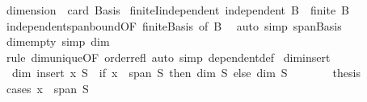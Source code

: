 \begin{isabellebody}
\isanewline
\isanewline
{}\isamarkupfalse%
\ {\isachardoublequoteopen}dimension\ {\isacharequal}{\kern0pt}\ card\ Basis{\isachardoublequoteclose}\isanewline
\isanewline
{}\isamarkupfalse%
\ finiteI{\isacharunderscore}{\kern0pt}independent{\isacharcolon}{\kern0pt}\ {\isachardoublequoteopen}independent\ B\ {\isasymLongrightarrow}\ finite\ B{\isachardoublequoteclose}\isanewline
%
\isadelimproof
\ \ %
\endisadelimproof
%
\isatagproof
{}\isamarkupfalse%
\ independent{\isacharunderscore}{\kern0pt}span{\isacharunderscore}{\kern0pt}bound{\isacharbrackleft}{\kern0pt}OF\ finite{\isacharunderscore}{\kern0pt}Basis{\isacharcomma}{\kern0pt}\ of\ B{\isacharbrackright}{\kern0pt}\ \isamarkupfalse%
\ {\isacharparenleft}{\kern0pt}auto\ simp{\isacharcolon}{\kern0pt}\ span{\isacharunderscore}{\kern0pt}Basis{\isacharparenright}{\kern0pt}%
\endisatagproof
{\isafoldproof}%
%
\isadelimproof
\isanewline
%
\endisadelimproof
\isanewline
{}\isamarkupfalse%
\ dim{\isacharunderscore}{\kern0pt}empty\ {\isacharbrackleft}{\kern0pt}simp{\isacharbrackright}{\kern0pt}{\isacharcolon}{\kern0pt}\ {\isachardoublequoteopen}dim\ {\isacharbraceleft}{\kern0pt}{\isacharbraceright}{\kern0pt}\ {\isacharequal}{\kern0pt}\ {}{\isachardoublequoteclose}\isanewline
%
\isadelimproof
\ \ %
\endisadelimproof
%
\isatagproof
{}\isamarkupfalse%
\ {\isacharparenleft}{\kern0pt}rule\ dim{\isacharunderscore}{\kern0pt}unique{\isacharbrackleft}{\kern0pt}OF\ order{\isacharunderscore}{\kern0pt}refl{\isacharbrackright}{\kern0pt}{\isacharparenright}{\kern0pt}\ {\isacharparenleft}{\kern0pt}auto\ simp{\isacharcolon}{\kern0pt}\ dependent{\isacharunderscore}{\kern0pt}def{\isacharparenright}{\kern0pt}%
\endisatagproof
{\isafoldproof}%
%
\isadelimproof
\isanewline
%
\endisadelimproof
\isanewline
{}\isamarkupfalse%
\ dim{\isacharunderscore}{\kern0pt}insert{\isacharcolon}{\kern0pt}\isanewline
\ \ {\isachardoublequoteopen}dim\ {\isacharparenleft}{\kern0pt}insert\ x\ S{\isacharparenright}{\kern0pt}\ {\isacharequal}{\kern0pt}\ {\isacharparenleft}{\kern0pt}if\ x\ {\isasymin}\ span\ S\ then\ dim\ S\ else\ dim\ S\ {\isacharplus}{\kern0pt}\ {}{\isacharparenright}{\kern0pt}{\isachardoublequoteclose}\isanewline
%
\isadelimproof
%
\endisadelimproof
%
\isatagproof
{}\isamarkupfalse%
\ {\isacharminus}{\kern0pt}\isanewline
\ \ \isamarkupfalse%
\ {\isacharquery}{\kern0pt}thesis\isanewline
\ \ \isamarkupfalse%
\ {\isacharparenleft}{\kern0pt}cases\ {\isachardoublequoteopen}x\ {\isasymin}\ span\ S{\isachardoublequoteclose}{\isacharparenright}{\kern0pt}\isanewline

\end{isabellebody}
